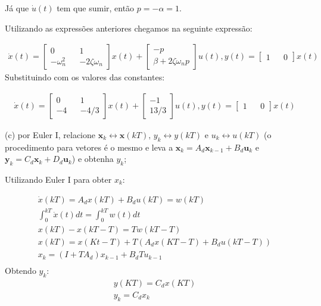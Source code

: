 \documentclass[10pt]{article}
\newcommand{\bm}[1]{\boldsymbol{#1}}
\begin{document}
Já que $\dot{u}(t)$ tem que sumir, então $p = - \alpha = 1$.

\vspace{\baselineskip}

Utilizando as expressões anteriores chegamos na seguinte expressão:

\begin{align*}
    \dot{x}(t) =
    \begin{bmatrix}
        0 && 1 \\
        -\omega_n^2 && -2\zeta\omega_n
    \end{bmatrix}
    x(t) +
    \begin{bmatrix}
        -p \\
        \beta + 2 \zeta\omega_n p
    \end{bmatrix}
    u(t), y(t) =
    \begin{bmatrix}
        1 && 0
    \end{bmatrix}
    x(t)
\end{align*}
Substituindo com os valores das constantes:

\begin{align*}
    \dot{x}(t) =
    \begin{bmatrix}
        0 && 1 \\
        -4 && -4/3
    \end{bmatrix}
    x(t) +
    \begin{bmatrix}
        -1 \\
        13/3
    \end{bmatrix}
    u(t), y(t) =
    \begin{bmatrix}
        1 && 0
    \end{bmatrix}
    x(t)
\end{align*}

(c) por Euler I, relacione $\bm{x}_k \leftrightarrow \bm{x}(kT), \, y_k \leftrightarrow y(kT)$ e $u_k \leftrightarrow u(kT)$ (o procedimento para vetores é o mesmo e leva a $\bm{x}_k = A_d \bm{x}_{k - 1} + B_d \bm{u}_k$ e $\bm{y}_k = C_d \bm{x}_k + D_d \bm{u}_k$) e obtenha $y_k$;

Utilizando Euler I para obter $x_k$:

\begin{align*}
    \dot{x}(kT) = A_dx(kT) + B_du(kT) = w(kT) \\
    \int_0^{kT}{\dot{x}(t)dt} = \int_0^{kT}{w(t)dt} \\
    x(kT) - x(kT - T) = Tw(kT - T) \\
    x(kT) = x(Kt - T) + T(A_dx(KT - T) + B_du(kT - T)) \\
    x_{k} = (I + TA_d)x_{k-1} + B_dTu_{k-1} \\
\end{align*}
Obtendo $y_k$:
\begin{align*}
    y(KT) = C_dx(KT) \\
    y_k = C_dx_k
\end{align*}
\end{document}
